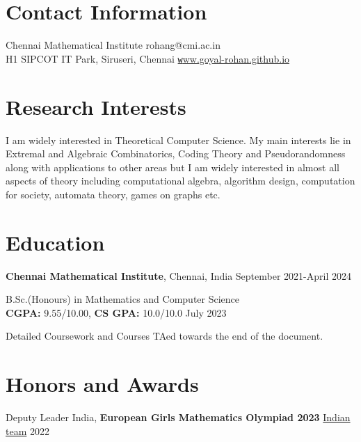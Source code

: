 \documentclass[margin,line, 10pt]{res}
\begin{document}

\begin{resume}
\section{\sc Contact Information}
Chennai Mathematical Institute \hfill {rohang@cmi.ac.in}\\
H1 SIPCOT IT Park, Siruseri, Chennai \hfill \href{https://goyal-rohan.github.io/}{\texttt www.goyal-rohan.github.io}

\section{\sc Research Interests}
I am widely interested in Theoretical Computer Science. My main interests lie in Extremal and Algebraic Combinatorics, Coding Theory and Pseudorandomness along with applications to other areas but I am widely interested in almost all aspects of theory including computational algebra, algorithm design, computation for society, automata theory, games on graphs etc.

\section{\sc Education}


{\bf Chennai Mathematical Institute}, Chennai, India \hfill September 2021-April 2024

\vspace{-0.4cm}
B.Sc.(Honours) in Mathematics and Computer Science\\ {\bf CGPA:} 9.55/10.00, {\bf CS GPA:} 10.0/10.0 \hfill July 2023


\vspace*{-0.3cm}
Detailed Coursework and Courses TAed towards the end of the document.


\section{\sc Honors and Awards} 
Deputy Leader India, {\bf European Girls Mathematics Olympiad 2023} \href{https://www.egmo.org/egmos/egmo12/countries/country35/}{Indian team} \hfill 2022


\end{resume}
\end{document}
